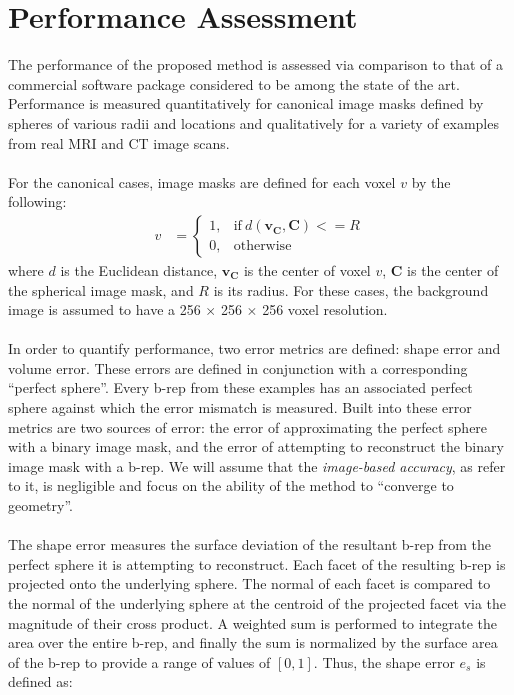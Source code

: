 \section{Performance Assessment}
%

The performance of the proposed method is assessed via comparison to that of a commercial software package considered to be among the state of the art. Performance is measured quantitatively for canonical image masks defined by spheres of various radii and locations and qualitatively for a variety of examples from real MRI and CT image scans. \\ \\
%
For the canonical cases, image masks are defined for each voxel ${v}$ by the following:
\begin{align} 
	v &=  \begin{cases}
		1, & \text{if}\ d \left(\bm{v_C},\bm{C}\right) <= R \\
		0, & \text{otherwise}
	\end{cases}
\end{align}
where $d$ is the Euclidean distance, $\bm{v_C}$ is the center of voxel $v$, $\bm{C}$ is the center of the spherical image mask, and $R$ is its radius. For these cases, the background image is assumed to have a 256 $\times$ 256 $\times$ 256 voxel resolution. \\ \\
%
In order to quantify performance, two error metrics are defined: shape error and volume error. These errors are defined in conjunction with a corresponding ``perfect sphere''. Every b-rep from these examples has an associated perfect sphere against which the error mismatch is measured. Built into these error metrics are two sources of error: the error of approximating the perfect sphere with a binary image mask, and the error of attempting to reconstruct the binary image mask with a b-rep. We will assume that the \textit{image-based accuracy}, as \cite{young_2008} refer to it, is negligible and focus on the ability of the method to ``converge to geometry''.\\ \\
%
The shape error measures the surface deviation of the resultant b-rep from the perfect sphere it is attempting to reconstruct. Each facet of the resulting b-rep is projected onto the underlying sphere. The normal of each facet is compared to the normal of the underlying sphere at the centroid of the projected facet via the magnitude of their cross product. A weighted sum is performed to integrate the area over the entire b-rep, and finally the sum is normalized by the surface area of the b-rep to provide a range of values of $\left[0,1\right]$. Thus, the shape error $e_s$ is defined as:
